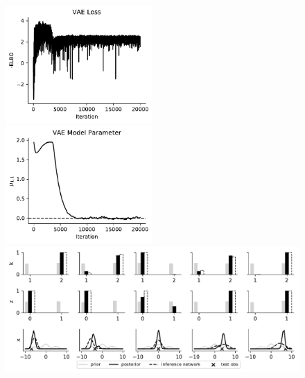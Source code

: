 \begin{figure}[!htb]
    \centering
    \includegraphics[width=0.5\textwidth]{figures/gmm-open-universe/vae_loss}
    \includegraphics[width=0.5\textwidth]{figures/gmm-open-universe/vae_model_param}
    \includegraphics[width=\textwidth]{figures/gmm-open-universe/vae_inference}
\end{figure}

